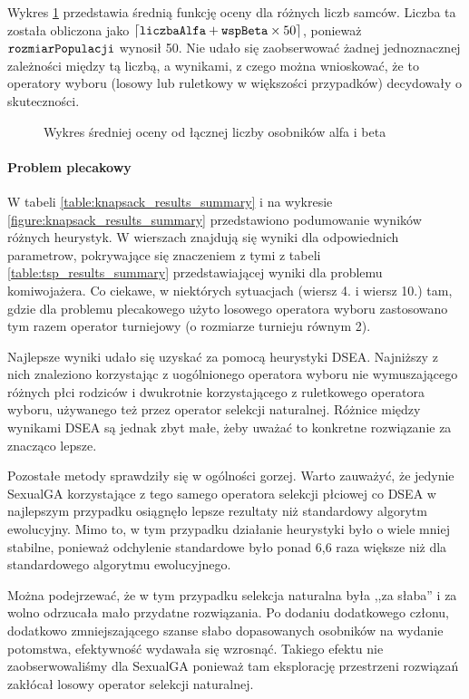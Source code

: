 \documentclass[./FM_mgr.tex]{subfiles}
\begin{document}
Wykres \ref{figure:tsp_male_avg} przedstawia średnią funkcję oceny dla różnych liczb samców.
Liczba ta została obliczona jako $\lceil \mathtt{liczbaAlfa} + \mathtt{wspBeta} \times 50 \rceil$, ponieważ $\mathtt{rozmiarPopulacji}$ wynosił 50.
Nie udało się zaobserwować żadnej jednoznacznej zależności między tą liczbą, a wynikami, z czego można wnioskować, że to operatory wyboru (losowy lub ruletkowy w większości przypadków) decydowały o skuteczności.

\newpage

\begin{figure}[H]
	\caption{Wykres średniej oceny od łącznej liczby osobników alfa i beta \label{figure:tsp_male_avg}}
	\centering
\end{figure}

\paragraph{Problem plecakowy}

W tabeli \ref{table:knapsack_results_summary} i na wykresie \ref{figure:knapsack_results_summary} przedstawiono podumowanie wyników różnych heurystyk. 
W wierszach znajdują się wyniki dla odpowiednich parametrow, pokrywające się znaczeniem z tymi z tabeli \ref{table:tsp_results_summary} przedstawiającej wyniki dla problemu komiwojażera.
Co ciekawe, w niektórych sytuacjach (wiersz 4. i wiersz 10.) tam, gdzie dla problemu plecakowego użyto losowego operatora wyboru zastosowano tym razem operator turniejowy (o rozmiarze turnieju równym 2).

Najlepsze wyniki udało się uzyskać za pomocą heurystyki DSEA. 
Najniższy z nich znaleziono korzystając z uogólnionego operatora wyboru nie wymuszającego różnych płci rodziców i dwukrotnie korzystającego z ruletkowego operatora wyboru, używanego też przez operator selekcji naturalnej.
Różnice między wynikami DSEA są jednak zbyt małe, żeby uważać to konkretne rozwiązanie za znacząco lepsze.

Pozostałe metody sprawdziły się w ogólności gorzej.
Warto zauważyć, że jedynie SexualGA korzystające z tego samego operatora selekcji płciowej co DSEA w najlepszym przypadku osiągnęło lepsze rezultaty niż standardowy algorytm ewolucyjny.
Mimo to, w tym przypadku działanie heurystyki było o wiele mniej stabilne, ponieważ odchylenie standardowe było ponad 6,6 raza większe niż dla standardowego algorytmu ewolucyjnego.

Można podejrzewać, że w tym przypadku selekcja naturalna była ,,za słaba'' i za wolno odrzucała mało przydatne rozwiązania.
Po dodaniu dodatkowego członu, dodatkowo zmniejszającego szanse słabo dopasowanych osobników na wydanie potomstwa, efektywność wydawała się wzrosnąć.
Takiego efektu nie zaobserwowaliśmy dla SexualGA ponieważ tam eksplorację przestrzeni rozwiązań zakłócał losowy operator selekcji naturalnej.
\end{document}

